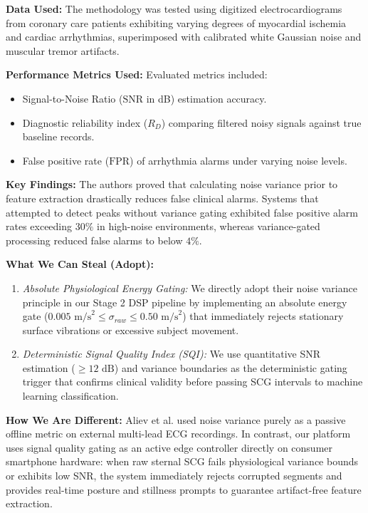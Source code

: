 \textbf{Data Used:} The methodology was tested using digitized electrocardiograms from coronary care patients exhibiting varying degrees of myocardial ischemia and cardiac arrhythmias, superimposed with calibrated white Gaussian noise and muscular tremor artifacts.

\textbf{Performance Metrics Used:} Evaluated metrics included:
\begin{itemize}
    \item Signal-to-Noise Ratio ($\text{SNR}$ in dB) estimation accuracy.
    \item Diagnostic reliability index ($R_D$) comparing filtered noisy signals against true baseline records.
    \item False positive rate ($\text{FPR}$) of arrhythmia alarms under varying noise levels.
\end{itemize}

\textbf{Key Findings:} The authors proved that calculating noise variance prior to feature extraction drastically reduces false clinical alarms. Systems that attempted to detect peaks without variance gating exhibited false positive alarm rates exceeding $30\%$ in high-noise environments, whereas variance-gated processing reduced false alarms to below $4\%$.

\textbf{What We Can Steal (Adopt):}
\begin{enumerate}
    \item \textit{Absolute Physiological Energy Gating:} We directly adopt their noise variance principle in our Stage 2 DSP pipeline by implementing an absolute energy gate ($0.005\text{ m/s}^2 \le \sigma_{raw} \le 0.50\text{ m/s}^2$) that immediately rejects stationary surface vibrations or excessive subject movement.
    \item \textit{Deterministic Signal Quality Index (SQI):} We use quantitative SNR estimation ($\ge 12\text{ dB}$) and variance boundaries as the deterministic gating trigger that confirms clinical validity before passing SCG intervals to machine learning classification.
\end{enumerate}

\textbf{How We Are Different:} Aliev et al. used noise variance purely as a passive offline metric on external multi-lead ECG recordings. In contrast, our platform uses signal quality gating as an active edge controller directly on consumer smartphone hardware: when raw sternal SCG fails physiological variance bounds or exhibits low SNR, the system immediately rejects corrupted segments and provides real-time posture and stillness prompts to guarantee artifact-free feature extraction.

